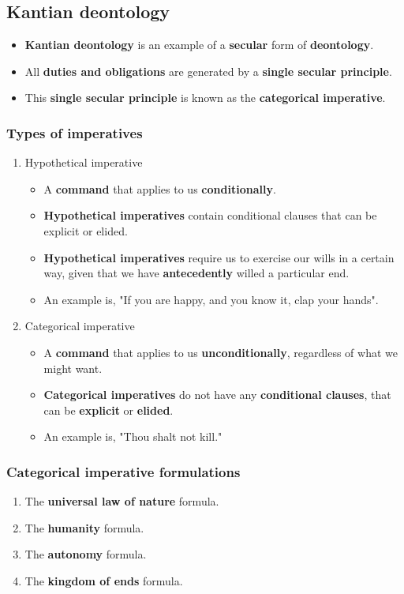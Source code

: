 \documentclass[11pt]{article}
\begin{document}
\subsection{Kantian deontology}
\label{sec:org4e341eb}
\begin{itemize}
\item \textbf{Kantian deontology} is an example of a \textbf{secular} form of \textbf{deontology}.
\item All \textbf{duties and obligations} are generated by a \textbf{single secular principle}.
\item This \textbf{single secular principle} is known as the \textbf{categorical imperative}.
\end{itemize}

 \newpage
\subsubsection{Types of imperatives}
\label{sec:org4c511d9}
\begin{enumerate}
\item Hypothetical imperative
\begin{itemize}
\item A \textbf{command} that applies to us \textbf{conditionally}.
\item \textbf{Hypothetical imperatives} contain conditional clauses that can be explicit or elided.
\item \textbf{Hypothetical imperatives} require us to exercise our wills in a certain way, given that we have \textbf{antecedently} willed a particular end.
\item An example is, "If you are happy, and you know it, clap your hands".
\end{itemize}
\item Categorical imperative
\begin{itemize}
\item A \textbf{command} that applies to us \textbf{unconditionally}, regardless of what we might want.
\item \textbf{Categorical imperatives} do not have any \textbf{conditional clauses}, that can be \textbf{explicit} or \textbf{elided}.
\item An example is, "Thou shalt not kill."
\end{itemize}
\end{enumerate}
\subsubsection{Categorical imperative formulations}
\label{sec:org3577271}
\begin{enumerate}
\item The \textbf{universal law of nature} formula.
\item The \textbf{humanity} formula.
\item The \textbf{autonomy} formula.
\item The \textbf{kingdom of ends} formula.
\end{enumerate}
\end{document}
